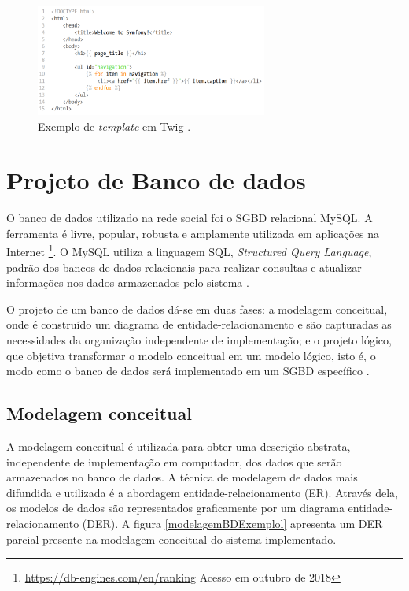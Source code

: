 \documentclass[cic,tc]{iiufrgs}
\begin{document}
\bigskip

\begin{figure}[ht]
    \caption{Exemplo de \textit{template} em Twig .}
       	\begin{center}
            \includegraphics[width=0.68\textwidth]{figuras/twig-symf.png}
        \end{center}
    \label{codeTemplateTwig}
\end{figure}


\section{Projeto de Banco de dados}
\label{metodologiaBD}

O banco de dados utilizado na rede social foi o SGBD relacional MySQL. A ferramenta é livre, popular, robusta e amplamente utilizada em aplicações na Internet \footnote{\url{https://db-engines.com/en/ranking} Acesso em outubro de 2018}. O MySQL utiliza a linguagem SQL, \textit{Structured Query Language}, padrão dos bancos de dados relacionais para realizar consultas e atualizar informações nos dados armazenados pelo sistema \cite{sqlCompleteBook}.

O projeto de um banco de dados dá-se em duas fases: a modelagem conceitual, onde é construído um diagrama de entidade-relacionamento \cite{peterChen1976} e são capturadas as necessidades da organização independente de implementação; e o projeto lógico, que objetiva transformar o modelo conceitual em um modelo lógico, isto é, o modo como o banco de dados será implementado em um SGBD específico \cite{heuser}.

\subsection{Modelagem conceitual}
\label{BDModelagem}

A modelagem conceitual é utilizada para obter uma descrição abstrata, independente de implementação em computador, dos dados que serão armazenados no banco de dados. A técnica de modelagem de dados mais difundida e utilizada é a abordagem entidade-relacionamento (ER). \cite{heuser} Através dela, os modelos de dados são representados graficamente por um diagrama entidade-relacionamento (DER). A figura \ref{modelagemBDExemplol} apresenta um DER parcial presente na modelagem conceitual do sistema implementado.
\end{document}
